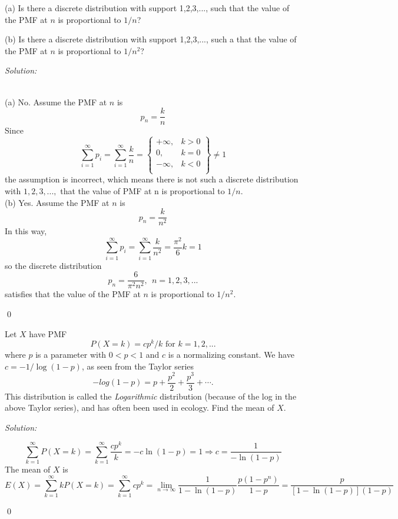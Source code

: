 \documentclass[12pt]{article}
\newenvironment{problem}[2][Problem]{\begin{trivlist}
\item[\hskip \labelsep {\bfseries #1}\hskip \labelsep {\bfseries #2.}]}{\end{trivlist}}
\newenvironment{sol}
    {\emph{Solution:}
    }
    {
    \qed
    }
\begin{document}
\begin{problem}{4}
(a) Is there a discrete distribution with support 1,2,3,..., such that the value of the PMF at $n$ is proportional to $1/n$?

(b) Is there a discrete distribution with support 1,2,3,..., such a that the value of the PMF at $n$ is proportional to $1/n^2$?
\end{problem}
\begin{sol}
\\(a) No. Assume the PMF at $n$ is
\[
p_n=\frac{k}{n}
\]
Since
\[
\sum_{i=1}^{\infty}p_i=\sum_{i=1}^{\infty}\frac{k}{n}=\left\{\begin{array}{ll}
+\infty,&k>0\\
0,&k=0\\
-\infty,&k<0\\
\end{array}\right\}\neq1
\]
the assumption is incorrect, which means there is not such a discrete distribution with $1,2,3,...,$ that the value of PMF at n is proportional to $1/n$.\\
(b) Yes. Assume the PMF at $n$ is
\[
p_n=\frac{k}{n^2}
\]
In this way,
\[
\sum_{i=1}^{\infty}p_i=\sum_{i=1}^{\infty}\frac{k}{n^2}=\frac{\pi^2}{6}k=1
\]
so the discrete distribution
\[
p_n=\frac{6}{\pi^2n^2},~~n=1,2,3,...
\]
satisfies that the value of the PMF at $n$ is proportional to $1/n^2$.
\end{sol}



\begin{problem}{5}
Let $X$ have PMF
\[P(X=k)=cp^k/k \text{ for } k=1,2,...\]
where $p$ is a parameter with $0<p<1$ and $c$ is a normalizing constant. We have $c=-1/\log(1-p)$, as seen from the Taylor series
\[-log(1-p)=p+\frac{p^2}{2}+\frac{p^3}{3}+\cdots.\]
This distribution is called the \textit{Logarithmic} distribution (because of the log in the above Taylor series), and has often been used in ecology. Find the mean of $X$.
\end{problem}
\begin{sol}
\[
\sum_{k=1}^{\infty}P(X=k)=\sum_{k=1}^{\infty}\frac{cp^k}{k}=-c\ln(1-p)=1\Longrightarrow c=\frac{1}{-\ln(1-p)}
\]
The mean of $X$ is
\[
E(X)=\sum_{k=1}^{\infty}kP(X=k)=\sum_{k=1}^{\infty}cp^k=\lim_{n\to\infty}\frac{1}{1-\ln(1-p)}\frac{p(1-p^n)}{1-p}=\frac{p}{[1-\ln(1-p)](1-p)}
\]
\end{sol}
\end{document}
